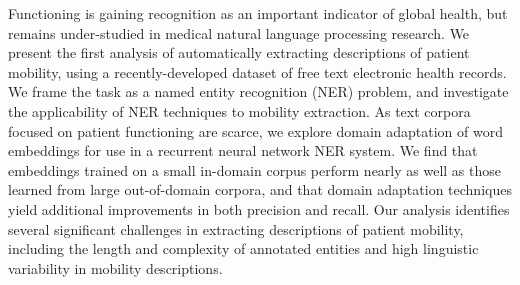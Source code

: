 Functioning is gaining recognition as an important indicator of global health, but remains under-studied in medical natural language processing research. We present the first analysis of automatically extracting descriptions of patient mobility, using a recently-developed dataset of free text electronic health records. We frame the task as a named entity recognition (NER) problem, and investigate the applicability of NER techniques to mobility extraction.  As text corpora focused on patient functioning are scarce, we explore domain adaptation of word embeddings for use in a recurrent neural network NER system. We find that embeddings trained on a small in-domain corpus perform nearly as well as those learned from large out-of-domain corpora, and that domain adaptation techniques yield additional improvements in both precision and recall. Our analysis identifies several significant challenges in extracting descriptions of patient mobility, including the length and complexity of annotated entities and high linguistic variability in mobility descriptions.
